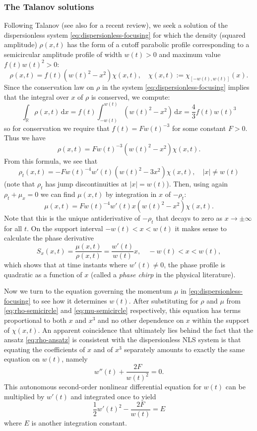 \documentclass[12pt]{amsart}
\numberwithin{equation}{section}
\newcommand{\dd}{\mathrm{d}}
\def\eq{\begin{equation}}
\def\endeq{\end{equation}}
\begin{document}
\subsubsection{The Talanov solutions}
\label{sec:Talanov}
Following Talanov \cite{Talanov65} (see also \cite[Section II]{DemontisORS23} for a recent review), we seek a solution of the dispersionless system \eqref{eq:dispersionless-focusing} for which 
the density (squared amplitude) $\rho(x,t)$ has the form of a cutoff parabolic profile corresponding to a semicircular amplitude profile of width $w(t)>0$ 
and maximum value $f(t)w(t)^2>0$:
\eq
\rho(x,t)=f(t)(w(t)^2-x^2)\chi(x,t),\quad\chi(x,t):=\chi_{[-w(t),w(t)]}(x).
\label{eq:rho-ansatz}
\endeq
Since the conservation law on $\rho$ in the system \eqref{eq:dispersionless-focusing} implies that the integral over $x$ of $\rho$ is conserved, we compute:
\eq
\int_{\mathbb{R}}\rho(x,t)\,\dd x=f(t)\int_{-w(t)}^{w(t)}(w(t)^2-x^2)\,\dd x =\frac{4}{3}f(t)w(t)^3
\endeq
so for conservation we require that $f(t)=Fw(t)^{-3}$ for some constant $F>0$.  Thus we have
\eq
\rho(x,t)=Fw(t)^{-3}(w(t)^2-x^2)\chi(x,t).
\label{eq:rho-semicircle}
\endeq
From this formula, we see that  
\eq
\rho_t(x,t)=-Fw(t)^{-4}w'(t)(w(t)^2-3x^2)\chi(x,t),\quad |x|\neq w(t)
\endeq
(note that $\rho_t$ has jump discontinuities at $|x|=w(t)$).
Then, using again $\rho_t+\mu_x=0$ we can find $\mu(x,t)$ by integration in $x$ of $-\rho_t$:
\eq
\mu(x,t)=Fw(t)^{-4}w'(t)x(w(t)^2-x^2)\chi(x,t).
\label{eq:mu-semicircle}
\endeq
Note that this is the unique antiderivative of $-\rho_t$ that decays to zero as $x\to\pm\infty$ for all $t$.  
On the support interval $-w(t)<x<w(t)$ it makes sense to calculate the phase derivative 
\eq
S_x(x,t)=\frac{\mu(x,t)}{\rho(x,t)} = \frac{w'(t)}{w(t)}x,\quad -w(t)<x<w(t),
\label{eq:phase-derivative}
\endeq
which shows that at time instants where $w'(t)\neq 0$, the phase profile is quadratic as a function of $x$ (called a \emph{phase chirp} in the physical literature).

Now we turn to the equation governing the momentum $\mu$ in \eqref{eq:dispersionless-focusing} to see how it determines $w(t)$.  After substituting for $\rho$ and $\mu$ from \eqref{eq:rho-semicircle} and \eqref{eq:mu-semicircle} respectively, this equation has terms proportional to both $x$ and $x^3$ and no other dependence on $x$ within the support of $\chi(x,t)$.  An apparent coincidence that ultimately lies behind the fact that the ansatz \eqref{eq:rho-ansatz} is consistent with the dispersionless NLS system is that equating the coefficients of $x$ and of $x^3$ separately amounts to exactly the same equation on $w(t)$, namely
\eq
w''(t)+\frac{2F}{w(t)^2}=0.
\endeq
This autonomous second-order nonlinear differential equation for $w(t)$ can be multiplied by $w'(t)$ and integrated once to yield
\eq
\frac{1}{2}w'(t)^2 -\frac{2F}{w(t)}=E
\label{eq:g-first-order}
\endeq
where $E$ is another integration constant.
\end{document}
